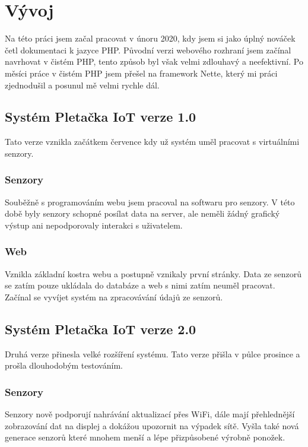 \chapter{Vývoj}
Na této práci jsem začal pracovat v únoru 2020, kdy jsem si jako úplný nováček četl dokumentaci k jazyce PHP. 
Původní verzi webového rozhraní jsem začínal navrhovat v čistém PHP, tento způsob byl však velmi zdlouhavý a neefektivní.
Po měsíci práce v čistém PHP jsem přešel na framework Nette, který mi práci zjednodušil a posunul mě velmi rychle dál. 


\section{Systém Pletačka IoT verze 1.0}
Tato verze vznikla začátkem července kdy už systém uměl pracovat s virtuálními senzory.


\subsection{Senzory}
Souběžně s programováním webu jsem pracoval na softwaru pro senzory.
V této době byly senzory schopné posílat data na server, ale neměli žádný grafický výstup ani nepodporovaly interakci s uživatelem.

\subsection{Web}
Vznikla základní kostra webu a postupně vznikaly první stránky.
Data ze senzorů se zatím pouze ukládala do databáze a web s nimi zatím neuměl pracovat.
Začínal se vyvíjet systém na zpracovávání údajů ze senzorů.


\newpage

\section{Systém Pletačka IoT verze 2.0}
Druhá verze přinesla velké rozšíření systému.
Tato verze přišla v půlce prosince a prošla dlouhodobým testováním.


\subsection{Senzory}
Senzory nově podporují nahrávání aktualizací přes WiFi, dále mají přehlednější zobrazování dat na displej a dokážou upozornit na výpadek sítě.
Vyšla také nová generace senzorů které mnohem menší a lépe přizpůsobené výrobně ponožek.

